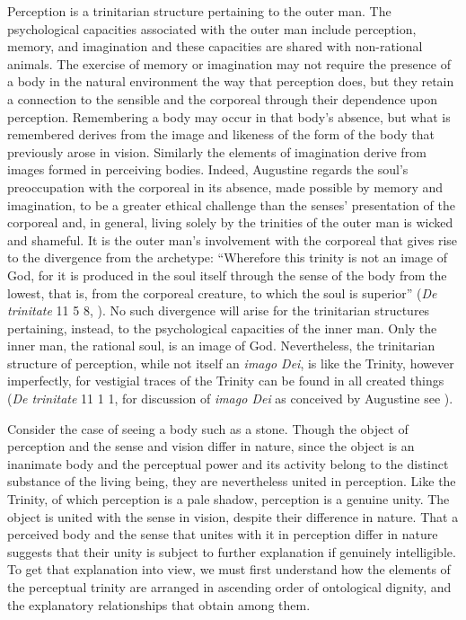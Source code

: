\documentclass[12pt]{article}
\begin{document}
Perception is a trinitarian structure pertaining to the outer man. The psychological capacities associated with the outer man include perception, memory, and imagination and these capacities are shared with non-rational animals. The exercise of memory or imagination may not require the presence of a body in the natural environment the way that perception does, but they retain a connection to the sensible and the corporeal through their dependence upon perception. Remembering a body may occur in that body's absence, but what is remembered derives from the image and likeness of the form of the body that previously arose in vision. Similarly the elements of imagination derive from images formed in perceiving bodies. Indeed, Augustine regards the soul's preoccupation with the corporeal in its absence, made possible by memory and imagination, to be a greater ethical challenge than the senses' presentation of the corporeal and, in general, living solely by the trinities of the outer man is wicked and shameful. It is the outer man's involvement with the corporeal that gives rise to the divergence from the archetype: ``Wherefore this trinity is not an image of God, for it is produced in the soul itself through the sense of the body from the lowest, that is, from the corporeal creature, to which the soul is superior'' (\emph{De trinitate} 11 5 8, \citealt[70]{Matthews:2002ly}). No such divergence will arise for the trinitarian structures pertaining, instead, to the psychological capacities of the inner man. Only the inner man, the rational soul, is an image of God. Nevertheless, the trinitarian structure of perception, while not itself an \emph{imago Dei}, is like the Trinity, however imperfectly, for vestigial traces of the Trinity can be found in all created things (\emph{De trinitate} 11 1 1, for discussion of \emph{imago Dei} as conceived by Augustine see \citealt[chapter 11]{Gioia:2008zm}).

Consider the case of seeing a body such as a stone. Though the object of perception and the sense and vision differ in nature, since the object is an inanimate body and the perceptual power and its activity belong to the distinct substance of the living being, they are nevertheless united in perception. Like the Trinity, of which perception is a pale shadow, perception is a genuine unity. The object is united with the sense in vision, despite their difference in nature. That a perceived body and the sense that unites with it in perception differ in nature suggests that their unity is subject to further explanation if genuinely intelligible. To get that explanation into view, we must first understand how the elements of the perceptual trinity are arranged in ascending order of ontological dignity, and the explanatory relationships that obtain among them.
\end{document}
